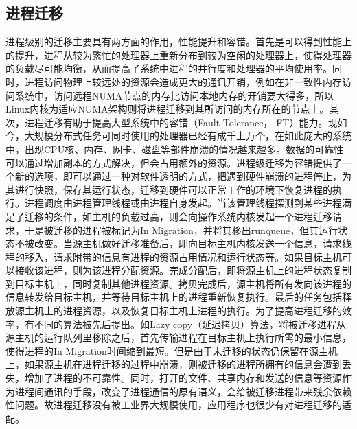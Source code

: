 \subsection{进程迁移}
进程级别的迁移主要具有两方面的作用，性能提升和容错\cite{processmigration}。首先是可以得到性能上的提升，进程从较为繁忙的处理器上重新分布到较为空闲的处理器上，使得处理器的负载尽可能均衡，从而提高了系统中进程的并行度和处理器的平均使用率。同时，进程访问物理上较远处的资源会造成更大的通讯开销，例如在非一致性内存访问系统中，访问远程NUMA节点的内存比访问本地内存的开销要大得多，所以Linux内核为适应NUMA架构则将进程迁移到其所访问的内存所在的节点上。其次，进程迁移有助于提高大型系统中的容错（Fault Tolerance， FT）能力。现如今，大规模分布式任务可同时使用的处理器已经有成千上万个，在如此庞大的系统中，出现CPU核、内存、网卡、磁盘等部件崩溃的情况越来越多。数据的可靠性可以通过增加副本的方式解决，但会占用额外的资源。进程级迁移为容错提供了一个新的选项，即可以通过一种对软件透明的方式，把遇到硬件崩溃的进程停止，为其进行快照，保存其运行状态，迁移到硬件可以正常工作的环境下恢复进程的执行。进程调度由进程管理线程或由进程自身发起。当该管理线程探测到某些进程满足了迁移的条件，如主机的负载过高，则会向操作系统内核发起一个进程迁移请求，于是被迁移的进程被标记为In Migration，并将其移出runqueue，但其运行状态不被改变。当源主机做好迁移准备后，即向目标主机内核发送一个信息，请求线程的移入，请求附带的信息有进程的资源占用情况和运行状态等。如果目标主机可以接收该进程，则为该进程分配资源。完成分配后，即将源主机上的进程状态复制到目标主机上，同时复制其他进程资源。拷贝完成后，源主机将所有发向该进程的信息转发给目标主机，并等待目标主机上的进程重新恢复执行。最后的任务包括释放源主机上的进程资源，以及恢复目标主机上进程的执行。为了提高进程迁移的效率，有不同的算法被先后提出\cite{migrationppt}。如Lazy copy（延迟拷贝）算法，将被迁移进程从源主机的运行队列里移除之后，首先传输进程在目标主机上执行所需的最小信息，使得进程的In Migration时间缩到最短。但是由于未迁移的状态仍保留在源主机上，如果源主机在进程迁移的过程中崩溃，则被迁移的进程所拥有的信息会遭到丢失，增加了进程的不可靠性。同时，打开的文件、共享内存和发送的信息等资源作为进程间通讯的手段，改变了进程通信的原有语义，会给被迁移进程带来残余依赖性问题。故进程迁移没有被工业界大规模使用，应用程序也很少有对进程迁移的适配。

